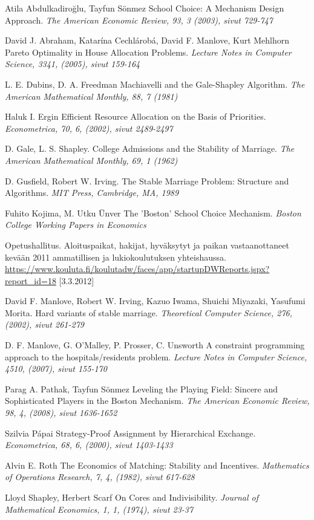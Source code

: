 \documentclass[gradu, twoside]{tktltiki}
\begin{document}

\begin{thebibliography}{XXX99}

  Atila Abdulkadiroğlu, Tayfun Sönmez
  School Choice: A Mechanism Design Approach.
  \emph{The American Economic Review, 93, 3 (2003), sivut 729-747}

  David J. Abraham, Katarína Cechlárobá, David F. Manlove, Kurt
  Mehlhorn
  Pareto Optimality in House Allocation Problems.
  \emph{Lecture Notes in Computer Science, 3341, (2005), sivut 159-164}

  L. E. Dubins, D. A. Freedman
  Machiavelli and the Gale-Shapley Algorithm.
  \emph{The American Mathematical Monthly, 88, 7 (1981)}

  Haluk I. Ergin
  Efficient Resource Allocation on the Basis of Priorities.
  \emph{Econometrica, 70, 6, (2002), sivut 2489-2497}

  D. Gale, L. S. Shapley.
  College Admissions and the Stability of Marriage.
  \emph{The American Mathematical Monthly, 69, 1 (1962)}

  D. Gusfield, Robert W. Irving.
  The Stable Marriage Problem: Structure and Algorithms.
  \emph{MIT Press, Cambridge, MA, 1989}

  Fuhito Kojima, M. Utku Ünver
  The 'Boston' School Choice Mechanism.
  \emph{Boston College Working Papers in Economics}

  Opetushallitus.
  Aloituspaikat, hakijat, hyväksytyt ja paikan vastaanottaneet
  kevään 2011 ammatillisen ja lukiokoulutuksen yhteishaussa.
  \url{https://www.kouluta.fi/koulutadw/faces/app/startupDWReports.jspx?report_id=18}
      [3.3.2012]

  David F. Manlove, Robert W. Irving, Kazuo Iwama, Shuichi Miyazaki,
  Yasufumi Morita.
  Hard variants of stable marriage.
  \emph{Theoretical Computer Science, 276, (2002), sivut 261-279}

  D. F. Manlove, G. O'Malley, P. Prosser, C. Unsworth
  A constraint programming approach to the hospitals/residents
  problem.
  \emph{Lecture Notes in Computer Science, 4510, (2007), sivut 155-170}

  Parag A. Pathak, Tayfun Sönmez
  Leveling the Playing Field: Sincere and Sophisticated Players in the
  Boston Mechanism.
  \emph{The American Economic Review, 98, 4, (2008), sivut 1636-1652}

  Szilvia Pápai
  Strategy-Proof Assignment by Hierarchical Exchange.
  \emph{Econometrica, 68, 6, (2000), sivut 1403-1433}

  Alvin E. Roth
  The Economics of Matching: Stability and Incentives.
  \emph{Mathematics of Operations Research, 7, 4, (1982), sivut 617-628}

  Lloyd Shapley, Herbert Scarf
  On Cores and Indivisibility.
  \emph{Journal of Mathematical Economics, 1, 1, (1974), sivut 23-37}

\end{thebibliography}
\lastpage
\end{document}
